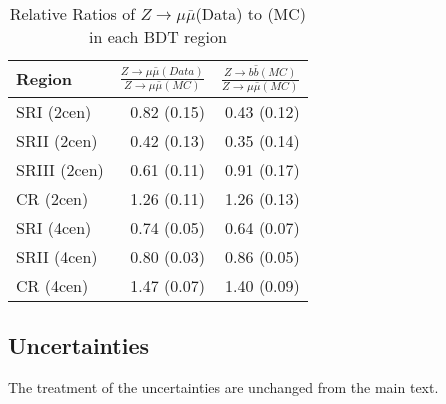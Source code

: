 \begin{table}[]
\centering
\caption{Relative Ratios of $Z\rightarrow \mu \bar \mu$(Data) to \zjets{}(MC) in each BDT region}
\label{tab:z_ratios-old}
\begin{tabular}{|l|r|r|}
\hline
Region       &  $\frac{Z\rightarrow \mu \bar \mu(Data)}{Z\rightarrow \mu \bar \mu(MC)}$ & $\frac{Z\rightarrow b \bar b(MC)}{Z\rightarrow \mu \bar \mu(MC)}$   \\ \hline
SRI (2cen)   & 0.82 (0.15) & 0.43 (0.12)\\ \hline
SRII (2cen)  & 0.42 (0.13) & 0.35 (0.14)\\ \hline
SRIII (2cen) & 0.61 (0.11) & 0.91 (0.17)\\ \hline
CR (2cen)    & 1.26 (0.11) & 1.26 (0.13)\\ \hline
SRI (4cen)   & 0.74 (0.05) & 0.64 (0.07)\\ \hline
SRII (4cen)  & 0.80 (0.03) & 0.86 (0.05)\\ \hline
CR (4cen)    & 1.47 (0.07) & 1.40 (0.09)\\ \hline

\end{tabular}
\end{table}




\subsection{Uncertainties}
\label{sec:uncertainties-old}
The treatment of the uncertainties are unchanged from the main text.
%



